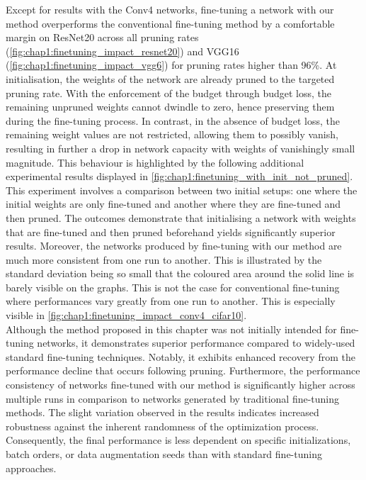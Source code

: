 Except for results with the Conv4 networks, fine-tuning a network with our
method overperforms the conventional fine-tuning method by a comfortable margin
on ResNet20 across all pruning rates
(\cref{fig:chap1:finetuning_impact_resnet20}) and VGG16
(\cref{fig:chap1:finetuning_impact_vgg6}) for pruning rates higher than 96\%. At
initialisation, the weights of the network are already pruned to the targeted
pruning rate. With the enforcement of the budget through budget loss, the
remaining unpruned weights cannot dwindle to zero, hence preserving them during
the fine-tuning process. In contrast, in the absence of budget loss, the
remaining weight values are not restricted, allowing them to possibly vanish,
resulting in further a drop in network capacity with weights of vanishingly
small magnitude. This behaviour is highlighted by the following additional
experimental results displayed in
\cref{fig:chap1:finetuning_with_init_not_pruned}. This experiment involves a
comparison between two initial setups: one where the initial weights are only
fine-tuned and another where they are fine-tuned and then pruned. The outcomes
demonstrate that initialising a network with weights that are fine-tuned and
then pruned beforehand yields significantly superior results. Moreover, the
networks produced by fine-tuning with our method are much more consistent from
one run to another. This is illustrated by the standard deviation being so small
that the coloured area around the solid line is barely visible on the graphs.
This is not the case for conventional fine-tuning where performances vary
greatly from one run to another. This is especially visible in
\cref{fig:chap1:finetuning_impact_conv4_cifar10}.\\

Although the method proposed in this chapter was not initially intended for
fine-tuning networks, it demonstrates superior performance compared to
widely-used standard fine-tuning techniques. Notably, it exhibits enhanced
recovery from the performance decline that occurs following pruning.
Furthermore, the performance consistency of networks fine-tuned with our method
is significantly higher across multiple runs in comparison to networks generated
by traditional fine-tuning methods. The slight variation observed in the results
indicates increased robustness against the inherent randomness of the
optimization process. Consequently, the final performance is less dependent on
specific initializations, batch orders, or data augmentation seeds than with
standard fine-tuning approaches.\\

